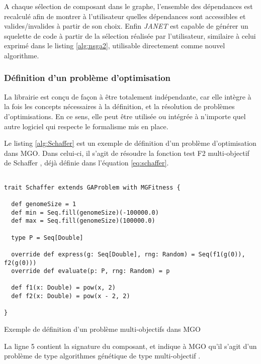 A chaque sélection de composant dans le graphe, l'ensemble des dépendances est recalculé afin de montrer à l'utilisateur quelles dépendances sont accessibles et valides/invalides à partir de son choix. Enfin \textit{JANET} est capable de générer un squelette de code à partir de la sélection réalisée par l'utilisateur, similaire à celui exprimé dans le listing \ref{alg:nsga2}, utilisable directement comme nouvel algorithme.

\subsubsection{Définition d'un problème d'optimisation}

La librairie est conçu de façon à être totalement indépendante, car elle intègre à la fois les concepts nécessaires à la définition, et la résolution de problèmes d'optimisations. En ce sens, elle peut être utilisée ou intégrée à n'importe quel autre logiciel qui respecte le formalisme mis en place.

Le listing \ref{alg:Schaffer} est un exemple de définition d'un problème d'optimisation dans MGO. Dans celui-ci, il s'agit de résoudre la fonction test F2 multi-objectif de Schaffer \textcite[94]{Schaffer1985}, déjà définie dans l'équation \ref{eq:schaffer}.

\begin{listing}[!htbp]

\begin{verbatim}

trait Schaffer extends GAProblem with MGFitness {

  def genomeSize = 1
  def min = Seq.fill(genomeSize)(-100000.0)
  def max = Seq.fill(genomeSize)(100000.0)

  type P = Seq[Double]

  override def express(g: Seq[Double], rng: Random) = Seq(f1(g(0)), f2(g(0)))
  override def evaluate(p: P, rng: Random) = p

  def f1(x: Double) = pow(x, 2)
  def f2(x: Double) = pow(x - 2, 2)

}

\end{verbatim}
\caption{Exemple de définition d'un problème multi-objectifs dans MGO}
\label{alg:Schaffer}
\end{listing}

La ligne 5 contient la signature du composant, et indique à MGO qu'il s'agit d'un problème de type algorithmes génétique  de type multi-objectif .

